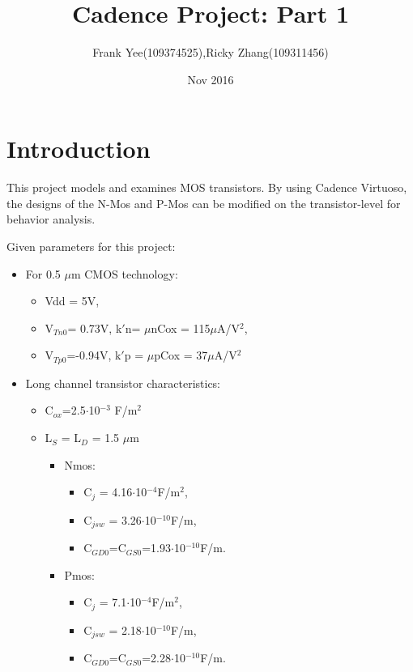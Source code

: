 \documentclass{article}
\title{Cadence Project: Part 1}
\author{Frank Yee(109374525),Ricky Zhang(109311456)}
\date{Nov 2016}
\begin{document}
   \maketitle
   \newpage
   \tableofcontents
   \newpage
   \section{Introduction}
   \par This project models and examines MOS transistors. By using Cadence Virtuoso, the designs of the N-Mos and P-Mos can be modified on the transistor-level for behavior analysis. 
   \par
   Given parameters for this project: 
   \begin{itemize}
   \item For 0.5 $\mu$m CMOS  technology:
   \begin{itemize}
   \item Vdd = 5V, 
   \item V$_{Tn0}$= 0.73V, k$\prime$n= $\mu$nCox = 115$\mu$A/V$^{2}$,
   \item V$_{Tp0}$=-0.94V, k$\prime$p = $\mu$pCox = 37$\mu$A/V$^{2}$
   \end{itemize}
   \item  Long channel transistor characteristics:
   \begin{itemize}
   \item C$_{ox}$=2.5$\cdot$10$^{-3}$ F/m$^{2}$
   \item L$_{S}$ = L$_{D}$ = 1.5 $\mu$m
   \begin{itemize}
   \item Nmos:
   \begin{itemize}   
   \item C$_{j}$ = 4.16$\cdot$10$^{-4}$F/m$^{2}$, 
   \item C$_{jsw}$ = 3.26$\cdot$10$^{-10}$F/m,
   \item C$_{GD0}$=C$_{GS0}$=1.93$\cdot$10$^{-10}$F/m.
   \end{itemize}
   \end{itemize}
   \begin{itemize}
   \item Pmos:
   \begin{itemize}   
   \item C$_{j}$ = 7.1$\cdot$10$^{-4}$F/m$^{2}$, 
   \item C$_{jsw}$ = 2.18$\cdot$10$^{-10}$F/m,
   \item C$_{GD0}$=C$_{GS0}$=2.28$\cdot$10$^{-10}$F/m.
   \end{itemize}
   \end{itemize}
   \end{itemize}
   \end{itemize}
   \newpage
\end{document}
